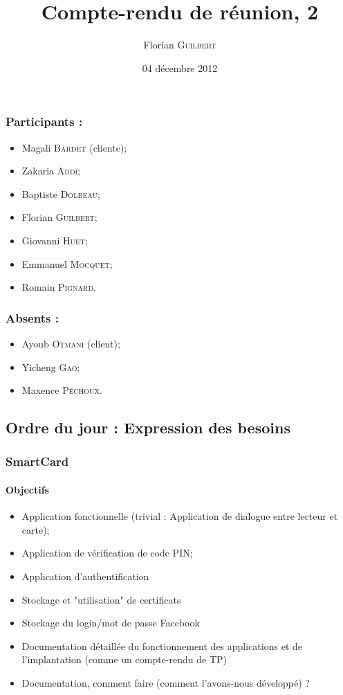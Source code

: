 \documentclass[a4paper,10pt]{article}
\author{Florian \textsc{Guilbert}}
\title{Compte-rendu de réunion, 2}
\date{04 décembre 2012}
\begin{document}
\maketitle

\subsubsection*{Participants : }
\begin{itemize}
    \item Magali \textsc{Bardet} (cliente);
    \item Zakaria \textsc{Addi};
    \item Baptiste \textsc{Dolbeau};
    \item Florian \textsc{Guilbert};
    \item Giovanni \textsc{Huet};
    \item Emmanuel \textsc{Mocquet};
    \item Romain \textsc{Pignard}.
\end{itemize}

\subsubsection*{Absents : }
\begin{itemize}
    \item Ayoub \textsc{Otmani} (client);
    \item Yicheng \textsc{Gao};
    \item Maxence  \textsc{Péchoux}.
\end{itemize}

\subsection*{Ordre du jour : Expression des besoins}

\subsubsection*{SmartCard}

\paragraph{Objectifs} 
\begin{itemize}
    \item Application fonctionnelle (trivial : Application de dialogue entre 
            lecteur et carte);
    \item Application de vérification de code PIN;
    \item Application d'authentification
    \item Stockage et "utilisation" de certificats
    \item Stockage du login/mot de passe Facebook
    \item Documentation détaillée du fonctionnement des applications et 
        de l'implantation (comme un compte-rendu de TP)
    \item Documentation, comment faire (comment l'avons-nous développé) ?
\end{itemize}
         
\end{document}

